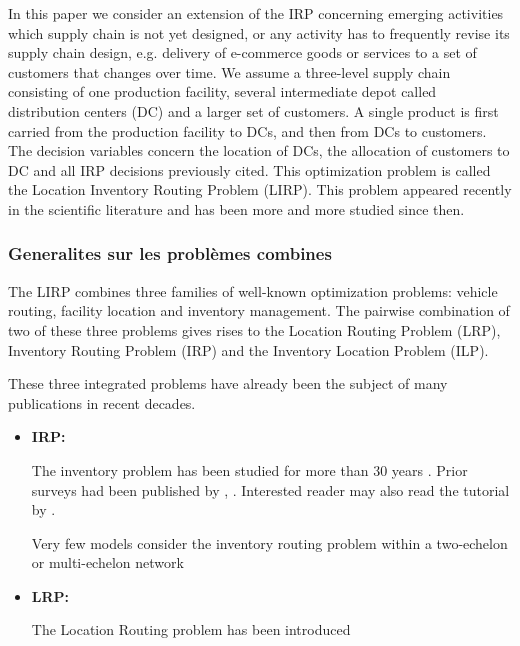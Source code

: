 \documentclass[a4paper,10pt]{article}
\begin{document}
\begin{linenumbers}
In this paper we consider an extension of the IRP concerning emerging activities which supply chain is not yet designed, 
or any activity has to frequently revise its supply chain design, e.g. delivery of e-commerce goods or services to a set of customers that changes over time. We assume a three-level supply chain consisting of one production facility, several intermediate depot called distribution centers (DC) and a larger set of customers. A single product is first carried from the production facility to DCs, and then from DCs to customers. The decision variables concern the location of DCs, the allocation of customers to DC and all IRP decisions previously cited. 
This optimization problem is called the Location Inventory Routing Problem (LIRP). This problem appeared recently in the scientific literature \cite{AhmadiJavid2010} and has been more and more studied since then. 





\subsubsection*{Generalites sur les problèmes combines}

The LIRP combines three families of well-known optimization problems: vehicle routing, facility location and inventory management. 
The pairwise combination of two of these three problems gives rises to the Location Routing Problem (LRP), Inventory Routing Problem (IRP) and the Inventory Location Problem (ILP). 

These three integrated problems have already been the subject of many publications in recent decades.

\begin{itemize}
	
	\item \textbf{IRP: }
	
	The inventory problem has been studied for more than 30 years \cite{Coelho2014}. Prior surveys had been published by \cite{Campbell98}, \cite{MoinSalhi2007}. Interested reader may also read the tutorial by \cite{Bertazzi2012}. 
	
	Very few models consider the inventory routing problem within a two-echelon or multi-echelon network	\cite{GuimaraesCoelho2019}
	
	\item \textbf{LRP: }
	
	The Location Routing problem has been introduced 
	

\end{itemize}
\end{linenumbers}
\end{document}
